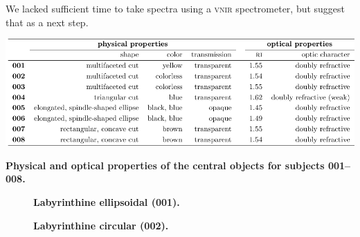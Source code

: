 \documentclass[10pt,twoside,openany]{article}
\theoremstyle{definition}
\begin{document}
We lacked sufficient time to take spectra using a \textsc{vnir} spectrometer, but suggest that as a next step.

\begin{table}[h]
\includegraphics[height=0.9\textheight]{gem_properties_table.pdf}
\caption{\label{tab:gem_properties}\textbf{Physical and optical properties of the central objects for subjects 001--008.}}
\end{table}

\begin{figure}
\begin{floatrow}
  {\caption{\label{fig:001}\textbf{Labyrinthine ellipsoidal (001).}}}
  {\caption{\label{fig:002}\textbf{Labyrinthine circular (002).}}}
\end{floatrow}
\end{figure}
\end{document}
